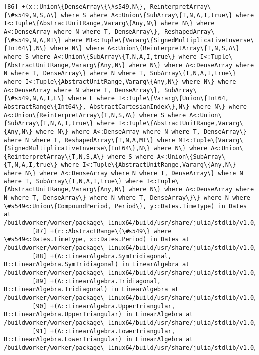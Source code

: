 \documentclass[11pt]{article}
\begin{document}
\begin{Verbatim}[commandchars=\\\{\}]
        [86] +(x::Union\{DenseArray\{\#s549,N\}, ReinterpretArray\{\#s549,N,S,A\} where S where A<:Union\{SubArray\{T,N,A,I,true\} where I<:Tuple\{AbstractUnitRange,Vararg\{Any,N\} where N\} where A<:DenseArray where N where T, DenseArray\}, ReshapedArray\{\#s549,N,A,MI\} where MI<:Tuple\{Vararg\{SignedMultiplicativeInverse\{Int64\},N\} where N\} where A<:Union\{ReinterpretArray\{T,N,S,A\} where S where A<:Union\{SubArray\{T,N,A,I,true\} where I<:Tuple\{AbstractUnitRange,Vararg\{Any,N\} where N\} where A<:DenseArray where N where T, DenseArray\} where N where T, SubArray\{T,N,A,I,true\} where I<:Tuple\{AbstractUnitRange,Vararg\{Any,N\} where N\} where A<:DenseArray where N where T, DenseArray\}, SubArray\{\#s549,N,A,I,L\} where L where I<:Tuple\{Vararg\{Union\{Int64, AbstractRange\{Int64\}, AbstractCartesianIndex\},N\} where N\} where A<:Union\{ReinterpretArray\{T,N,S,A\} where S where A<:Union\{SubArray\{T,N,A,I,true\} where I<:Tuple\{AbstractUnitRange,Vararg\{Any,N\} where N\} where A<:DenseArray where N where T, DenseArray\} where N where T, ReshapedArray\{T,N,A,MI\} where MI<:Tuple\{Vararg\{SignedMultiplicativeInverse\{Int64\},N\} where N\} where A<:Union\{ReinterpretArray\{T,N,S,A\} where S where A<:Union\{SubArray\{T,N,A,I,true\} where I<:Tuple\{AbstractUnitRange,Vararg\{Any,N\} where N\} where A<:DenseArray where N where T, DenseArray\} where N where T, SubArray\{T,N,A,I,true\} where I<:Tuple\{AbstractUnitRange,Vararg\{Any,N\} where N\} where A<:DenseArray where N where T, DenseArray\} where N where T, DenseArray\}\} where N where \#s549<:Union\{CompoundPeriod, Period\}, y::Dates.TimeType) in Dates at /buildworker/worker/package\_linux64/build/usr/share/julia/stdlib/v1.0/Dates/src/arithmetic.jl:87
        [87] +(r::AbstractRange\{\#s549\} where \#s549<:Dates.TimeType, x::Dates.Period) in Dates at /buildworker/worker/package\_linux64/build/usr/share/julia/stdlib/v1.0/Dates/src/ranges.jl:58
        [88] +(A::LinearAlgebra.SymTridiagonal, B::LinearAlgebra.SymTridiagonal) in LinearAlgebra at /buildworker/worker/package\_linux64/build/usr/share/julia/stdlib/v1.0/LinearAlgebra/src/tridiag.jl:158
        [89] +(A::LinearAlgebra.Tridiagonal, B::LinearAlgebra.Tridiagonal) in LinearAlgebra at /buildworker/worker/package\_linux64/build/usr/share/julia/stdlib/v1.0/LinearAlgebra/src/tridiag.jl:644
        [90] +(A::LinearAlgebra.UpperTriangular, B::LinearAlgebra.UpperTriangular) in LinearAlgebra at /buildworker/worker/package\_linux64/build/usr/share/julia/stdlib/v1.0/LinearAlgebra/src/triangular.jl:487
        [91] +(A::LinearAlgebra.LowerTriangular, B::LinearAlgebra.LowerTriangular) in LinearAlgebra at /buildworker/worker/package\_linux64/build/usr/share/julia/stdlib/v1.0/LinearAlgebra/src/triangular.jl:488

\end{Verbatim}
\end{document}

